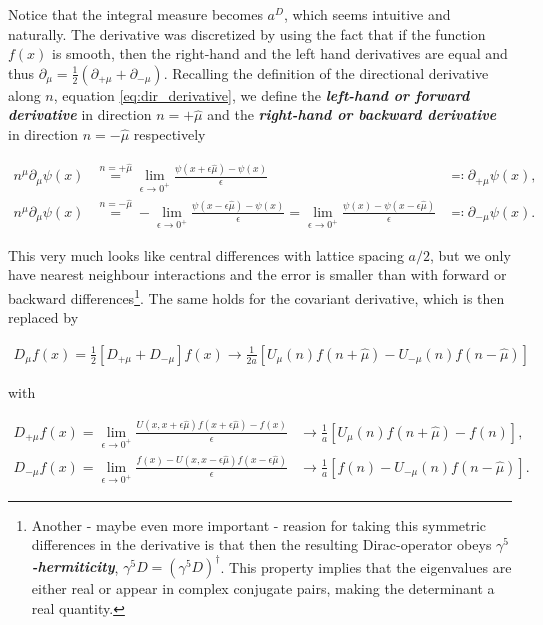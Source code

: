 \documentclass{article}
\theoremstyle{plain} %
\theoremstyle{convention} %
\theoremstyle{remark} %
\def\df#1{\textbf{\textit{#1}}}
\numberwithin{equation}{section}
\begin{document}
Notice that the integral measure becomes $a^D$, which seems intuitive and naturally. The derivative was discretized by using the fact that if the function $f(x)$ is smooth, then the right-hand and the left hand derivatives are equal and thus $\partial_{\mu} = \frac{1}{2}(\partial_{+\mu} + \partial_{-\mu})$. Recalling the definition of the directional derivative along $n$, equation \eqref{eq:dir_derivative}, we define the \df{left-hand or forward derivative} in direction $n=+\hat{\mu}$ and the \df{right-hand or backward derivative} in direction $n=-\hat{\mu}$ respectively

\begin{align*}
    n^{\mu} \partial_{\mu} \psi(x) &\stackrel{n = +\hat{\mu}}{=} \lim_{\epsilon \to 0^{+}} \frac{ \psi(x + \epsilon \hat{\mu}) - \psi(x) }{\epsilon} &\eqqcolon \partial_{+\mu} \psi(x), \\
    n^{\mu} \partial_{\mu} \psi(x) &\stackrel{n = -\hat{\mu}}{=} - \lim_{\epsilon \to 0^{+}} \frac{ \psi(x - \epsilon \hat{\mu}) - \psi(x) }{\epsilon} = \lim_{\epsilon \to 0^{+}} \frac{ \psi(x) - \psi(x - \epsilon \hat{\mu}) }{\epsilon} &\eqqcolon \partial_{-\mu} \psi(x).
\end{align*}


This very much looks like central differences with lattice spacing $a/2$, but we only have nearest neighbour interactions and the error is smaller than with forward or backward differences\footnote{Another - maybe even more important - reasion for taking this symmetric differences in the derivative is that then the resulting Dirac-operator obeys \df{$\gamma^5$-hermiticity}, $\gamma^5 D = (\gamma^5 D)^{\dagger}$. This property implies that the eigenvalues are either real or appear in complex conjugate pairs, making the determinant a real quantity.}. The same holds for the covariant derivative, which is then replaced by

\begin{align*}
    D_{\mu} f(x) = \frac{1}{2} \left[ D_{+\mu} + D_{-\mu} \right] f(x) \longrightarrow \frac{1}{2a} \left[ U_{\mu}(n) f(n+\hat{\mu}) - U_{-\mu}(n) f(n-\hat{\mu}) \right]
\end{align*}

with 

\begin{align*}
    D_{+\mu} f(x) = \lim_{\epsilon \to 0^{+}} \frac{ U(x,x + \epsilon \hat{\mu}) f(x + \epsilon \hat{\mu}) - f(x) }{\epsilon} &\longrightarrow \frac{1}{a} \left[ U_{\mu}(n) f(n + \hat{\mu}) - f(n) \right], \\
    D_{-\mu} f(x) = \lim_{\epsilon \to 0^{+}} \frac{ f(x) - U(x,x - \epsilon \hat{\mu}) f(x - \epsilon \hat{\mu}) }{\epsilon} &\longrightarrow \frac{1}{a} \left[ f(n) - U_{-\mu}(n) f(n - \hat{\mu}) \right].
\end{align*}
\end{document}
